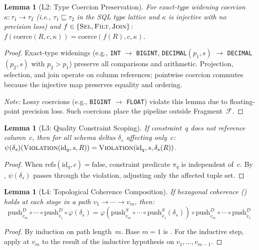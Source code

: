 \documentclass[11pt,a4paper]{article}
\newtheorem{lemma}[theorem]{Lemma}
\theoremstyle{definition}
\newcommand{\push}{\mathrm{push}}
\newcommand{\FragF}{\mathcal{F}}
\begin{document}
\begin{lemma}[L2: Type Coercion Preservation]\label{lem:type-coercion}
For \emph{exact-type} widening coercion $\kappa\colon \tau_1 \to \tau_2$
(i.e., $\tau_1 \sqsubseteq \tau_2$ in the SQL type lattice and $\kappa$
is injective with no precision loss) and $f \in \{\textsc{Sel}, \textsc{Filt},
\textsc{Join}\}$: $f(\mathrm{coerce}(R, c, \kappa)) = \mathrm{coerce}(f(R), c, \kappa)$.
\end{lemma}
\begin{proof}
Exact-type widenings (e.g., \texttt{INT} $\to$ \texttt{BIGINT},
\texttt{DECIMAL}$(p_1,s)$ $\to$ \texttt{DECIMAL}$(p_2,s)$ with $p_2 > p_1$)
preserve all comparisons and arithmetic.  Projection, selection, and join
operate on column references; pointwise coercion commutes because the injective
map preserves equality and ordering.

\emph{Note:} Lossy coercions (e.g., \texttt{BIGINT} $\to$ \texttt{FLOAT})
violate this lemma due to floating-point precision loss.  Such coercions
place the pipeline outside Fragment~$\FragF$.
\end{proof}

\begin{lemma}[L3: Quality Constraint Scoping]\label{lem:quality-scope}
If constraint~$q$ does not reference column~$c$, then for all schema deltas
$\delta_s$ affecting only~$c$:
$\psi(\delta_s)(\textsc{Violation}(\mathrm{id}_q, s, R)) =
 \textsc{Violation}(\mathrm{id}_q, s, \delta_s(R))$.
\end{lemma}
\begin{proof}
When $\mathrm{refs}(\mathrm{id}_q, c) = \mathrm{false}$, constraint predicate
$\pi_q$ is independent of~$c$.  By , $\psi(\delta_s)$ passes
through the violation, adjusting only the affected tuple set.
\end{proof}

\begin{lemma}[L4: Topological Coherence Composition]\label{lem:topo-coherence}
If hexagonal coherence () holds at each stage in a
path $v_1 \to \cdots \to v_m$, then:
\[
\push_{v_m}^D \circ \cdots \circ \push_{v_1}^D \circ \varphi(\delta_s)
= \varphi(\push_{v_m}^S \circ \cdots \circ \push_{v_1}^S(\delta_s))
  \circ \push_{v_m}^D \circ \cdots \circ \push_{v_1}^D
\]
\end{lemma}
\begin{proof}
By induction on path length~$m$.  Base $m=1$ is .
For the inductive step, apply  at $v_m$ to the result
of the inductive hypothesis on $v_1, \ldots, v_{m-1}$.
\end{proof}
\end{document}

